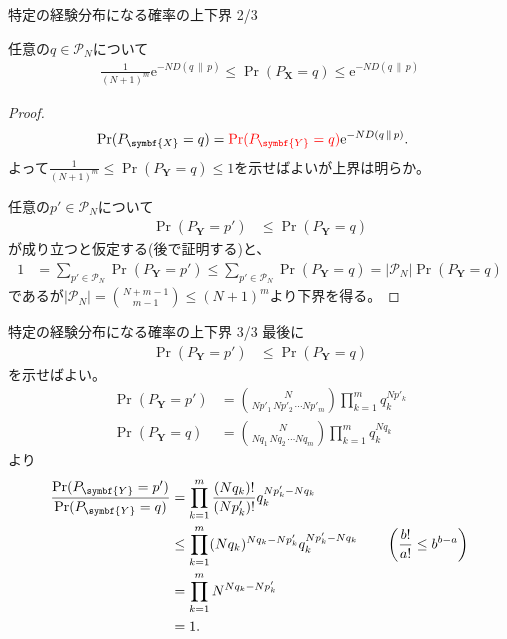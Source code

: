 \documentclass[lualatex,handout]{beamer}
\newcommand{\mycolor}[2]{%
  \begingroup
  \colorlet{currentcolor}{.}%
  \color{#1}#2%
  \color{currentcolor}%
  \endgroup
}
\newcommand{\emm}[1]{\mycolor{red}{#1}}
\newcommand\KL[2]{D(#1\,\|\,#2)}
\theoremstyle{definition}
\begin{document}
\begin{frame}{特定の経験分布になる確率の上下界 2/3}
\footnotesize
\begin{lemma}
任意の$q\in\mathcal{P}_N$について
\begin{align*}
\frac1{(N+1)^m}\mathrm{e}^{-N \KL{q}{p}}\le
\Pr(P_{\symbf{X}} = q)
\le \mathrm{e}^{-N \KL{q}{p}}
\end{align*}
\end{lemma}
\begin{proof}
\vspace{-2em}
\begin{align*}
\Pr(P_{\symbf{X}}= q) &= \emm{\Pr(P_{\symbf{Y}}= q)}\mathrm{e}^{-N \KL{q}{p}}.
\end{align*}
よって$\frac1{(N+1)^m}\le\Pr(P_{\symbf{Y}}= q)\le 1$を示せばよいが上界は明らか。

%
任意の$p'\in\mathcal{P}_N$について
\begin{align*}
\Pr\left(P_{\symbf{Y}}= p'\right)&\le
\Pr\left(P_{\symbf{Y}}= q\right)
\end{align*}
が成り立つと仮定する(後で証明する)と、
\begin{align*}
1&=\sum_{p'\in\mathcal{P}_N} \Pr\left(P_{\symbf{Y}}= p'\right)
\le\sum_{p'\in\mathcal{P}_N} \Pr\left(P_{\symbf{Y}}= q\right)
=|\mathcal{P}_N| \Pr\left(P_{\symbf{Y}}= q\right)
\end{align*}
であるが$|\mathcal{P}_N|=\binom{N+m-1}{m-1}\le (N+1)^m$より下界を得る。
\end{proof}
\end{frame}

\begin{frame}{特定の経験分布になる確率の上下界 3/3}
\small
最後に
\begin{align*}
\Pr\left(P_{\symbf{Y}}= p'\right)&\le
\Pr\left(P_{\symbf{Y}}= q\right)
\end{align*}
を示せばよい。
\begin{align*}
\Pr(P_{\symbf{Y}}= p') &= \binom{N}{Np'_1\,Np'_2\,\dotsm Np'_m} \prod_{k=1}^m q_k^{Np'_k}\\
\Pr(P_{\symbf{Y}}= q) &= \binom{N}{Nq_1\,Nq_2\,\dotsm Nq_m} \prod_{k=1}^m q_k^{Nq_k}
\end{align*}
より
\begin{align*}
\frac{\Pr(P_{\symbf{Y}}= p')}{\Pr(P_{\symbf{Y}}= q)}&=\prod_{k=1}^m\frac{(Nq_k)!}{(Np'_k)!}q_k^{Np'_k-Nq_k}\\
&\le\prod_{k=1}^m(Nq_k)^{Nq_k - Np'_k}q_k^{Np'_k-Nq_k}\qquad \left(\frac{b!}{a!}\le b^{b-a}\right)\\
&=\prod_{k=1}^mN^{Nq_k - Np'_k}\\
&=1.\qedhere
\end{align*}
\end{frame}
\end{document}
